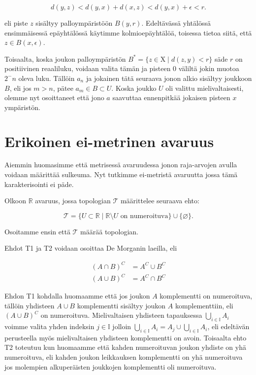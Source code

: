 \documentclass[12pt,a4paper,leqno]{report}
\newcommand{\R}{\mathbb{R}}
\newcommand{\X}{\mathrm{X}}
\newcommand{\T}{\mathcal{T}}
\theoremstyle{plain}
\theoremstyle{definition}
\theoremstyle{remark}
\begin{document}
\begin{equation}
d(y,z) < d(y,x) + d(x,z) < d(y,x) + \epsilon < r\text{.}
\end{equation}

eli piste $z$ sisältyy palloympäristöön $B(y,r)$. Edeltävässä yhtälössä ensimmäisessä epäyhtälössä käytimme kolmioepäyhtälöä, toisessa tietoa siitä, että $z \in B(x,\epsilon)$.

Toisaalta, koska joukon palloympäristön $B^* = \{z \in \X \mid d(z,y) < r\}$ säde $r$ on positiivinen reaaliluku, voidaan valita tämän ja pisteen $0$ väliltä jokin muotoa $2^-n$ oleva luku. Tällöin $a_n$ ja jokainen tätä seuraava jonon alkio sisältyy joukkoon $B$, eli jos $m > n$, pätee $a_m \in B \subset U$. Koska joukko $U$ oli valittu mielivaltaisesti, olemme nyt osoittaneet että jono $a$ saavuttaa ennenpitkää jokaisen pisteen $x$ ympäristön.

\chapter{Erikoinen ei-metrinen avaruus}
Aiemmin huomasimme että metrisessä avaruudessa jonon raja-arvojen avulla voidaan määrittää sulkeuma. Nyt tutkimme ei-metristä avaruutta jossa tämä karakterisointi ei päde.

Olkoon $\R$ avaruus, jossa topologian $\T$ määrittelee seuraava ehto:

\begin{equation}
\T = \{U \subset \R \mid \R \setminus U \text{ on numeroituva} \} \cup \{ \varnothing \}\text{.}
\end{equation}

Osoitamme ensin että $\T$ määrää topologian.

Ehdot T1 ja T2 voidaan osoittaa De Morganin laeilla, eli 

\begin{align}
(A \cap B)^C &= A^C \cup B^C \\
(A \cup B)^C &= A^C \cap B^C
\end{align}

Ehdon T1 kohdalla huomaamme että jos joukon $A$ komplementti on numeroituva, tällöin yhdisteen $A \cup B$ komplementti sisältyy joukon $A$ komplementtiin, eli $(A \cup B)^C$ on numeroituva. Mielivaltaisen yhdisteen tapauksessa $\bigcup_{i \in \mathbb{I}} A_i$ voimme valita yhden indeksin $j \in \mathbb{I}$ jolloin $\bigcup_{i \in \mathbb{I}} A_i = A_j \cup\bigcup_{i \in \mathbb{I}} A_i$, eli edeltävän perusteella myös mielivaltaisen yhdisteen komplementti on avoin. Toisaalta ehto T2 toteutuu kun huomaamme että kahden numeroituvan joukon yhdiste on yhä numeroituva, eli kahden joukon leikkauksen komplementti on yhä numeroituva jos molempien alkuperäisten joukkojen komplementti oli numeroituva.
\end{document}
